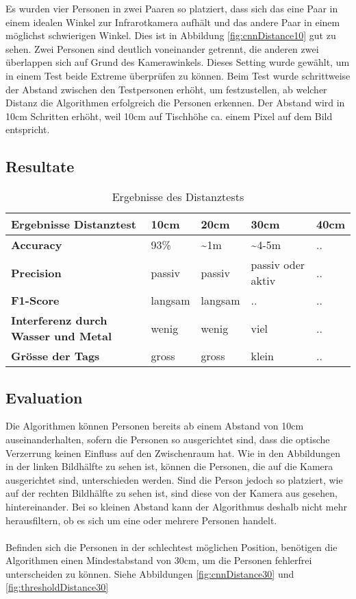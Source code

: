 Es wurden vier Personen in zwei Paaren so platziert, dass sich das eine Paar in einem idealen Winkel zur Infrarotkamera aufhält und das andere Paar in einem möglichst schwierigen Winkel. Dies ist in Abbildung \ref{fig:cnnDistance10} gut zu sehen. Zwei Personen sind deutlich voneinander getrennt, die anderen zwei überlappen sich auf Grund des Kamerawinkels. Dieses Setting wurde gewählt, um in einem Test beide Extreme überprüfen zu können. 
Beim Test wurde schrittweise der Abstand zwischen den Testpersonen erhöht, um festzustellen, ab welcher Distanz die Algorithmen erfolgreich die Personen erkennen. Der Abstand wird in 10cm Schritten erhöht, weil 10cm auf Tischhöhe ca. einem Pixel auf dem Bild entspricht.

\subsection{Resultate}

\begin{table}[H]
	\begin{tabularx}{\textwidth}{|X|X|X|X|X|}
		\hline
		\textbf{Ergebnisse Distanztest} & \textbf{10cm} & \textbf{20cm} & \textbf{30cm} & \textbf{40cm}\\
		\hline 
		\textbf{Accuracy} & 93\% & \textasciitilde 1m & \textasciitilde 4-5m & ..\\
		\hline  
		\textbf{Precision} & passiv & passiv & passiv oder aktiv & ..\\
		\hline
		\textbf{F1-Score} & langsam & langsam & .. & ..\\
		\hline
		\textbf{Interferenz durch Wasser und Metal} & wenig & wenig & viel & ..\\
		\hline
		\textbf{Grösse der Tags} & gross & gross & klein & ..\\
		\hline
	\end{tabularx}
	\caption{Ergebnisse des Distanztests}
	\label{tbl:distance}
\end{table}

\subsection{Evaluation}

Die Algorithmen können Personen bereits ab einem Abstand von 10cm auseinanderhalten, sofern die Personen so ausgerichtet sind, dass die optische Verzerrung keinen Einfluss auf den Zwischenraum hat. Wie in den Abbildungen in der linken Bildhälfte zu sehen ist, können die Personen, die auf die Kamera ausgerichtet sind, unterschieden werden. Sind die Person jedoch so platziert, wie auf der rechten Bildhälfte zu sehen ist, sind diese von der Kamera aus gesehen, hintereinander. Bei so kleinen Abstand kann der Algorithmus deshalb nicht mehr herausfiltern, ob es sich um eine oder mehrere Personen handelt.\\
\\
Befinden sich die Personen in der schlechtest möglichen Position, benötigen die Algorithmen einen Mindestabstand von 30cm, um die Personen fehlerfrei unterscheiden zu können. Siehe Abbildungen \ref{fig:cnnDistance30} und \ref{fig:thresholdDistance30}

